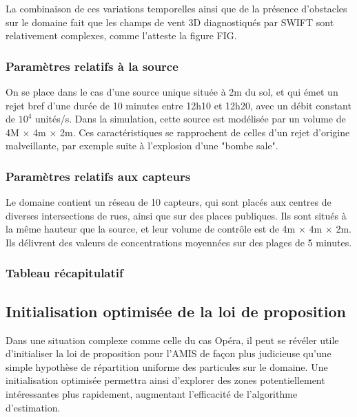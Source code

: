 La combinaison de ces variations temporelles ainsi que de la présence d'obstacles sur le domaine fait que les champs de vent 3D diagnostiqués par SWIFT sont relativement complexes, comme l'atteste la figure FIG.


\subsubsection{Paramètres relatifs à la source}

On se place dans le cas d'une source unique située à 2m du sol, et qui émet un rejet bref d'une durée de 10 minutes entre 12h10 et 12h20, avec un débit constant de $10^4$ unités/s. Dans la simulation, cette source est modélisée par un volume de 4M $\times$ 4m $\times$ 2m. Ces caractéristiques se rapprochent de celles d'un rejet d'origine malveillante, par exemple suite à l'explosion d'une "bombe sale". \\


\subsubsection{Paramètres relatifs aux capteurs}

Le domaine contient un réseau de 10 capteurs, qui sont placés aux centres de diverses intersections de rues, ainsi que sur des places publiques. Ils sont situés à la même hauteur que la source, et leur volume de contrôle est de 4m $\times$ 4m $\times$ 2m. Ils délivrent des valeurs de concentrations moyennées sur des plages de 5 minutes. \\

\subsubsection{Tableau récapitulatif}




\subsection{Initialisation optimisée de la loi de proposition}

Dans une situation complexe comme celle du cas Opéra, il peut se révéler utile d'initialiser la loi de proposition pour l'AMIS de façon plus judicieuse qu'une simple hypothèse de répartition uniforme des particules sur le domaine. Une initialisation optimisée permettra ainsi d'explorer des zones potentiellement intéressantes plus rapidement, augmentant l'efficacité de l'algorithme d'estimation. \\

